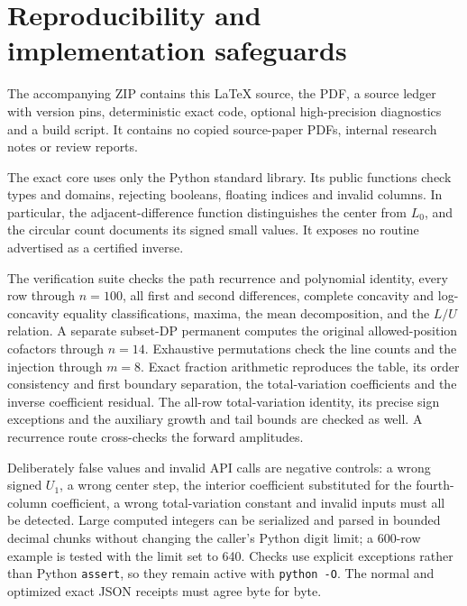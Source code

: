 \documentclass[11pt,letterpaper]{article}
\theoremstyle{remark}\newtheorem{remark}[theorem]{Remark}
\begin{document}
\section{Reproducibility and implementation safeguards}\label{fcm:sec:repro}
The accompanying ZIP contains this \LaTeX{} source, the PDF, a source ledger with version pins, deterministic exact code, optional high-precision diagnostics and a build script. It contains no copied source-paper PDFs, internal research notes or review reports.

The exact core uses only the Python standard library. Its public functions check types and domains, rejecting booleans, floating indices and invalid columns. In particular, the adjacent-difference function distinguishes the center from $L_0$, and the circular count documents its signed small values. It exposes no routine advertised as a certified inverse.

The verification suite checks the path recurrence and polynomial identity, every row through $n=100$, all first and second differences, complete concavity and log-concavity equality classifications, maxima, the mean decomposition, and the $L/U$ relation. A separate subset-DP permanent computes the original allowed-position cofactors through $n=14$. Exhaustive permutations check the line counts and the injection through $m=8$. Exact fraction arithmetic reproduces the table, its order consistency and first boundary separation, the total-variation coefficients and the inverse coefficient residual. The all-row total-variation identity, its precise sign exceptions and the auxiliary growth and tail bounds are checked as well. A recurrence route cross-checks the forward amplitudes.

Deliberately false values and invalid API calls are negative controls: a wrong signed $U_1$, a wrong center step, the interior coefficient substituted for the fourth-column coefficient, a wrong total-variation constant and invalid inputs must all be detected. Large computed integers can be serialized and parsed in bounded decimal chunks without changing the caller's Python digit limit; a 600-row example is tested with the limit set to 640. Checks use explicit exceptions rather than Python \texttt{assert}, so they remain active with \texttt{python -O}. The normal and optimized exact JSON receipts must agree byte for byte.
\end{document}
